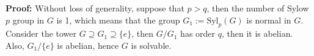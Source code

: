 \documentclass[12pt]{article}
\begin{document}
\textbf{Proof:} Without loss of generality, suppose that $p>q$, then the number of Sylow $p$ group in $G$ is 1, which means that the group $G_{1}:=\text{Syl}_{p}(G)$ is normal in $G$. Consider the tower $G\supseteq G_{1}\supseteq\{e\}$, then $G/G_{1}$ has order $q$, then it is abelian. Also, $G_{1}/\{e\}$ is abelian, hence $G$ is solvable. 
\end{document}
